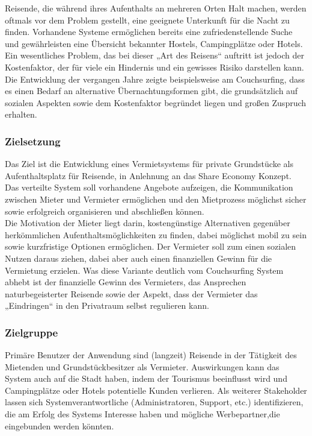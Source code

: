 
Reisende, die während ihres Aufenthalts an mehreren Orten Halt machen, werden oftmals vor dem Problem gestellt, eine geeignete Unterkunft für die Nacht zu finden. Vorhandene Systeme ermöglichen bereits eine zufriedenstellende Suche und gewährleisten eine Übersicht bekannter Hostels, Campingplätze oder Hotels.\\
Ein wesentliches Problem, das bei dieser „Art des Reisens“ auftritt ist jedoch der Kostenfaktor, der für viele ein Hindernis und ein gewisses Risiko darstellen kann.\\
Die Entwicklung der vergangen Jahre zeigte beispielsweise am Couchsurfing, dass es einen Bedarf an alternative Übernachtungsformen gibt, die grundsätzlich auf sozialen Aspekten sowie dem Kostenfaktor begründet liegen und großen Zuspruch erhalten.


\subsubsection{Zielsetzung}
Das Ziel ist die Entwicklung eines Vermietsystems für private Grundstücke als Aufenthaltsplatz für Reisende, in Anlehnung an das Share Economy Konzept.\\
Das verteilte System soll vorhandene Angebote aufzeigen, die Kommunikation zwischen Mieter und Vermieter ermöglichen und den Mietprozess möglichst sicher sowie erfolgreich organisieren und abschließen können.\\
Die Motivation der Mieter liegt darin, kostengünstige Alternativen gegenüber herkömmlichen Aufenthaltsmöglichkeiten zu finden, dabei möglichst mobil zu sein sowie kurzfristige Optionen ermöglichen. Der Vermieter soll zum einen sozialen Nutzen daraus ziehen, dabei aber auch einen finanziellen Gewinn für die Vermietung erzielen. Was diese Variante deutlich vom Couchsurfing System abhebt ist der finanzielle Gewinn des Vermieters, das Ansprechen naturbegeisterter Reisende sowie der Aspekt, dass der Vermieter das „Eindringen“ in den Privatraum selbst regulieren kann.


\subsubsection{Zielgruppe}
Primäre Benutzer der Anwendung sind (langzeit) Reisende in der Tätigkeit des Mietenden und Grundstückbesitzer als Vermieter. Auswirkungen kann das System auch auf die Stadt haben, indem der Tourismus beeinflusst wird und Campingplätze oder Hotels potentielle Kunden verlieren. Als weiterer Stakeholder lassen sich Systemverantwortliche (Administratoren, Support, etc.) identifizieren, die am Erfolg des Systems Interesse haben und mögliche Werbepartner,die eingebunden werden könnten.


